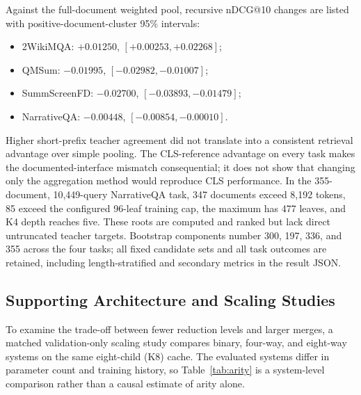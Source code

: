 \documentclass[10pt]{article}
\begin{document}
Against the full-document weighted pool, recursive nDCG@10 changes are listed
with positive-document-cluster 95\% intervals:
\begin{itemize}[nosep,leftmargin=2em]
\item 2WikiMQA: \(+0.01250\), \([+0.00253,+0.02268]\);
\item QMSum: \(-0.01995\), \([-0.02982,-0.01007]\);
\item SummScreenFD: \(-0.02700\), \([-0.03893,-0.01479]\);
\item NarrativeQA: \(-0.00448\), \([-0.00854,-0.00010]\).
\end{itemize}
Higher short-prefix teacher agreement did not translate into a consistent
retrieval advantage over simple pooling.
The CLS-reference advantage on every task makes the documented-interface
mismatch consequential; it does not show that changing only the aggregation
method would reproduce CLS performance. In the 355-document, 10,449-query
NarrativeQA task, 347 documents exceed 8,192 tokens, 85 exceed the configured
96-leaf training cap, the maximum has 477 leaves, and K4 depth reaches five.
These roots are computed and ranked but lack direct untruncated teacher targets.
Bootstrap components number 300, 197, 336, and 355 across the four tasks;
all fixed candidate sets and all task outcomes are retained, including
length-stratified and secondary metrics in the result JSON.

\subsection{Supporting Architecture and Scaling Studies}
\label{sec:architecture-scaling}

To examine the trade-off between fewer reduction levels and larger merges,
a matched validation-only scaling study compares binary, four-way, and
eight-way systems on the same eight-child (K8) cache. The evaluated systems differ in
parameter count and training history, so Table~\ref{tab:arity} is a
system-level comparison rather than a causal estimate of arity alone.

\begin{table}[H]
\caption{Matched validation-only arity comparison. Throughput and depth are
specific to this scaling protocol and are not directly comparable with the
official full-document throughput in Table~\ref{tab:full-document}.}
\label{tab:arity}
\centering
\small
{}
\end{table}
\end{document}
